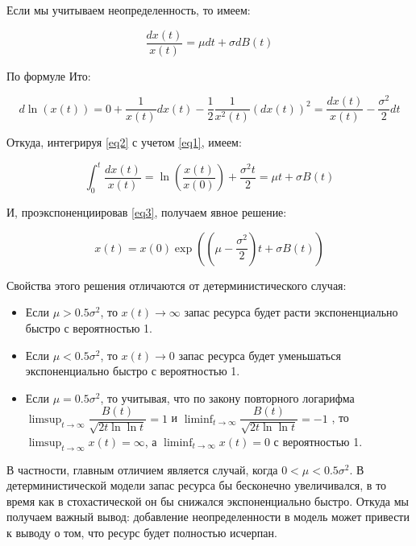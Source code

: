 \documentclass[12pt,a4paper, oneside]{extreport}
\begin{document}
Если мы учитываем   неопределенность, то имеем: 

\begin{equation}\label{eq1}
\dfrac{dx(t)}{x(t)} =  \mu  dt +\sigma dB(t)
\end{equation}

По формуле Ито:

\begin{equation}\label{eq2}
d \ln(x(t) )  =  0 + \dfrac{1}{x(t) } d x(t) -  \dfrac{1}{2} \dfrac{1}{x^2(t)} (d x(t)) ^2 =  \dfrac{d x(t)}{x(t) }   -  \dfrac{\sigma^2}{2}  d t 
\end{equation} 


Откуда, интегрируя \eqref{eq2} с учетом \eqref{eq1}, имеем: 

\begin{equation}\label{eq3}
\int_{0}^{t} \dfrac{dx(t)}{x(t)} = \ln\left( \dfrac{x(t)}{x(0)}  \right) + \dfrac{\sigma^2  t}{2}    =   \mu  t +\sigma B(t) 
\end{equation}


И, проэкспоненциировав \eqref{eq3}, получаем  явное решение:

\begin{equation}\label{it}
x(t) =  x(0) \exp \left(    \left(  \mu - \dfrac{\sigma^2}{2} \right)    t +\sigma B(t) \right) 
\end{equation}



Свойства этого решения отличаются от детерминистического случая: 

\begin{itemize}
	\item Если $ \mu > 0.5 \sigma^2  $, то  $ x (t) \rightarrow \infty $ запас ресурса  будет расти экспоненциально быстро с вероятностью 1. 
	\item Если $ \mu <  0.5 \sigma^2 $, то  $  x (t) \rightarrow 0 $ запас ресурса  будет уменьшаться  экспоненциально быстро с вероятностью 1.
	\item Если $ \mu =  0.5 \sigma^2 $, то учитывая, что по закону повторного логарифма   $ \limsup_{t \rightarrow \infty} \dfrac{B(t)}{\sqrt{2t \ln \ln t } } = 1  $ и  $ \liminf_{t \rightarrow \infty} \dfrac{B(t)}{\sqrt{2t \ln \ln t } } = -1  $ ,  то  $ \limsup_{t \rightarrow \infty}  x (t) = \infty $, а  $ \liminf_{t \rightarrow \infty}  x (t) = 0 $   с вероятностью 1. 
\end{itemize}

В частности, главным отличием является   случай, когда $ 0 < \mu <  0.5 \sigma^2  $. В детерминистической модели запас ресурса бы  бесконечно увеличивался, в то время как в стохастической он бы снижался экспоненциально    быстро. Откуда мы получаем важный вывод: добавление неопределенности в модель может привести к выводу о том, что ресурс будет полностью  исчерпан.    
\end{document}
